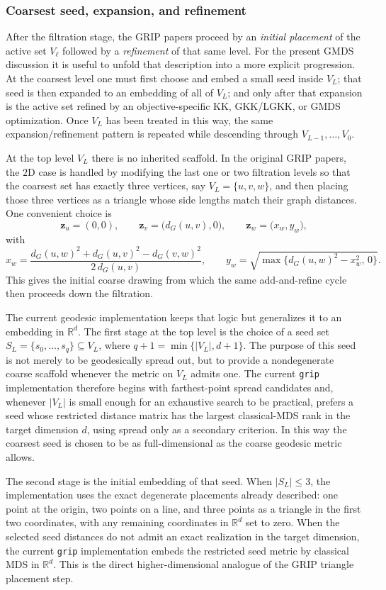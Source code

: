 \documentclass[11pt]{article}
\newcommand{\R}{\mathbb{R}}
\newcommand{\bz}{\mathbf{z}}
\begin{document}
\subsubsection*{Coarsest seed, expansion, and refinement}
After the filtration stage, the GRIP papers proceed by an
\emph{initial placement} of the active set $V_\ell$ followed by a
\emph{refinement} of that same level.  For the present GMDS discussion it is
useful to unfold that description into a more explicit progression.
At the coarsest level one must first choose and embed a small seed inside
$V_L$; that seed is then expanded to an embedding of all of $V_L$; and only
after that expansion is the active set refined by an objective-specific KK,
GKK/LGKK, or GMDS optimization.  Once $V_L$ has been treated in this way, the
same expansion/refinement pattern is repeated while descending through
$V_{L-1},\dots,V_0$.

At the top level $V_L$ there is no inherited scaffold.  In the original GRIP
papers, the $2$D case is handled by modifying the last one or two filtration
levels so that the coarsest set has exactly three vertices, say
$V_L = \{u,v,w\}$, and then placing those three vertices as a triangle whose
side lengths match their graph distances.  One convenient choice is
\[
  \bz_u = (0,0),\qquad
  \bz_v = \bigl(d_G(u,v),0\bigr),\qquad
  \bz_w = \bigl(x_w,y_w\bigr),
\]
with
\[
  x_w = \frac{d_G(u,w)^2 + d_G(u,v)^2 - d_G(v,w)^2}{2\,d_G(u,v)},
  \qquad
  y_w = \sqrt{\max\{d_G(u,w)^2 - x_w^2,\,0\}}.
\]
This gives the initial coarse drawing from which the same add-and-refine cycle
then proceeds down the filtration.

The current geodesic implementation keeps that logic but generalizes it to an
embedding in $\R^d$.  The first stage at the top level is the choice of a seed
set
$S_L = \{s_0,\dots,s_q\} \subseteq V_L$, where
$q+1 = \min\{\lvert V_L\rvert, d+1\}$.  The purpose of this seed is not merely
to be geodesically spread out, but to provide a nondegenerate coarse scaffold
whenever the metric on $V_L$ admits one.  The current \texttt{grip}
implementation therefore begins with farthest-point spread candidates and,
whenever $\lvert V_L\rvert$ is small enough for an exhaustive search to be
practical, prefers a seed whose restricted distance matrix has the largest
classical-MDS rank in the target dimension $d$, using spread only as a
secondary criterion.  In this way the coarsest seed is chosen to be as
full-dimensional as the coarse geodesic metric allows.

The second stage is the initial embedding of that seed.  When
$\lvert S_L\rvert \le 3$, the implementation uses the exact degenerate
placements already described: one point at the origin, two points on a line,
and three points as a triangle in the first two coordinates, with any remaining
coordinates in $\R^d$ set to zero.  When the selected seed distances do not
admit an exact realization in the target dimension, the current
\texttt{grip} implementation embeds the restricted seed metric by classical MDS
in $\R^d$.  This is the direct higher-dimensional analogue of the GRIP triangle
placement step.
\end{document}
